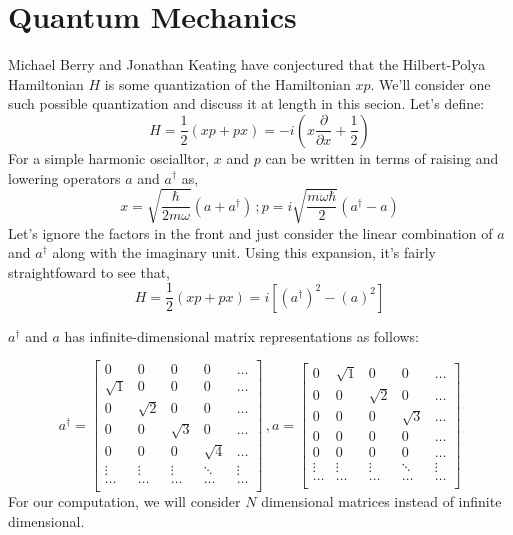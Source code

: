 \documentclass{amsproc}
\newcommand{\be}{\begin{equation}}
\newcommand{\ee}{\end{equation}}
\theoremstyle{definition}
\theoremstyle{remark}
\numberwithin{equation}{section}
\begin{document}
\section{Quantum Mechanics}
Michael Berry and Jonathan Keating have conjectured that the Hilbert-Polya Hamiltonian $H$ is some quantization of the Hamiltonian $xp$. We'll consider one such possible quantization and discuss it at length in this secion. Let's define:
\be
H = \frac{1}{2} \left( x p + p x \right) = -i \left( x\frac{ \partial}{\partial x} + \frac{1}{2} \right)
\ee
For a simple harmonic oscialltor, $x$ and $p$ can be written in terms of raising and lowering operators $a$ and $a^{\dagger}$ as,
\be
x = \sqrt{\frac{ \hbar }{ 2 m \omega }} (a + a^{\dagger} )\,;
p = i \sqrt{ \frac{m \omega \hbar }{ 2 } } ( a^{\dagger} - a )
\ee
Let's ignore the factors in the front and just consider the linear combination of $a$ and $a^{\dagger}$ along with the imaginary unit. Using this expansion, it's fairly straightfoward to see that,
\be
H = \frac{1}{2} \left( xp + px \right) = i \left[ ( a^{\dagger} )^2 - (a)^2 \right]
\ee

$a^{\dagger}$ and $a$ has infinite-dimensional matrix representations as follows:

\[
a^{\dagger}
=
\begin{bmatrix}
    0        & 0        & 0        &  0       & \dots  \\
    \sqrt{1} & 0        & 0        &  0       & \dots   \\
    0        & \sqrt{2} & 0        &  0       &\dots   \\
    0        & 0        & \sqrt{3} &  0       & \dots   \\
    0        & 0        & 0        & \sqrt{4} & \dots   \\
    \vdots & \vdots & \vdots & \ddots & \vdots \\
    \hdots & \hdots & \hdots & \hdots & \hdots \\
\end{bmatrix} \, ,
a
=
\begin{bmatrix}
    0        & \sqrt{1} & 0        &  0       & \dots  \\
    0        & 0        & \sqrt{2} &  0       & \dots   \\
    0        & 0        & 0        & \sqrt{3} &\dots   \\
    0        & 0        & 0        &  0       & \dots   \\
    0        & 0        & 0        &  0 & \dots   \\
    \vdots & \vdots & \vdots & \ddots & \vdots \\
    \hdots & \hdots & \hdots & \hdots & \hdots \\
\end{bmatrix}
\]
For our computation, we will consider $N$ dimensional matrices instead of infinite dimensional. 
\end{document}
